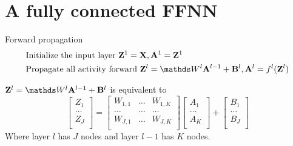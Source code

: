 \newcommand{\cA}{\mathcal{A}} \newcommand{\cB}{\mathcal{B}} \newcommand{\cC}{\mathcal{C}} \newcommand{\cD}{\mathcal{D}} \newcommand{\cE}{\mathcal{E}} \newcommand{\cF}{\mathcal{F}} \newcommand{\cG}{\mathcal{G}} \newcommand{\cH}{\mathcal{H}} \newcommand{\cI}{\mathcal{I}} \newcommand{\cJ}{\mathcal{J}} \newcommand{\cK}{\mathcal{K}} \newcommand{\cL}{\mathcal{L}} \newcommand{\cM}{\mathcal{M}} \newcommand{\cN}{\mathcal{N}} \newcommand{\cO}{\mathcal{O}} \newcommand{\cP}{\mathcal{P}} \newcommand{\cQ}{\mathcal{Q}} \newcommand{\cR}{\mathcal{R}} \newcommand{\cS}{\mathcal{S}} \newcommand{\cT}{\mathcal{T}} \newcommand{\cU}{\mathcal{U}} \newcommand{\cV}{\mathcal{V}} \newcommand{\cW}{\mathcal{W}} \newcommand{\cX}{\mathcal{X}} \newcommand{\cY}{\mathcal{Y}} \newcommand{\cZ}{\mathcal{Z}}

\newcommand{\ewise}[2]{{#1 * #2}} %

\newcommand{\EE}{\mathrm{E}} %

\newcommand{\g}{\,\vert\,} %

\newcommand{\set}[1]{\{{#1}\}}

\section {A fully connected FFNN} \label {sec: fcffnn}
Forward propagation
\begin {equation} \begin {split}
& \text {Initialize the input layer } \vZ^1 = \vX, \vA^1 = \vZ^1 \\
& \text {Propagate all activity forward } \vZ^l = \mW^l \vA^{l-1} + \vB^l, \vA^l = f^l(\vZ^l) \\
\end {split} \end {equation}

$\vZ^l = \mW^l \vA^{l-1} + \vB^l$ is equivalent to 
\begin{equation} \label {eq: nnwts}
\begin{bmatrix}
Z_1 \\
\ldots \\
Z_J \\
\end{bmatrix}
= 
\begin{bmatrix}
W_{1,1} & \ldots & W_{1,K} \\
\ldots & \ldots & \ldots \\
W_{J,1} & \ldots & W_{J,K} \\
\end{bmatrix}
\begin{bmatrix}
A_1 \\
\ldots \\
A_K \\
\end{bmatrix} 
+
\begin{bmatrix}
B_1 \\
\ldots \\
B_J \\
\end{bmatrix}
\end{equation}
Where layer $l$ has $J$ nodes and layer $l-1$ has $K$ nodes.

